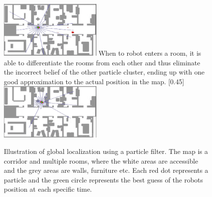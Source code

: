 \begin{figure}[!b]
        [0.45\textwidth]
        {\includegraphics[width=0.45\textwidth]{ParticleFilter/demo4.png}}
%
\hspace{0.02\textwidth} %
%
        {When to robot enters a room, it is able to differentiate the rooms from each other and thus eliminate the incorrect belief of the other particle cluster, ending up with one good approximation to the actual position in the map. \label{subfig:demo4}}
        [0.45\textwidth]
        {\includegraphics[width=0.45\textwidth]{ParticleFilter/demo5.png}}

    \caption[Short Caption]{Illustration of global localization using a particle filter. The map is a corridor and multiple rooms, where the white areas are accessible and the grey areas are walls, furniture etc. Each red dot represents a particle and the green circle represents the best guess of the robots position at each specific time.}
    \label{fig:particleDemo}
\end{figure}